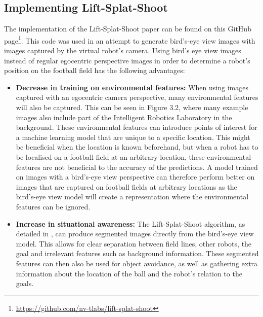 \documentclass{uva-inf-bachelor-thesis}
\begin{document}
        \subsection{Implementing Lift-Splat-Shoot}
            The implementation of the Lift-Splat-Shoot paper \cite{liftsplatshoot} can be found on this GitHub page\footnote{\url{https://github.com/nv-tlabs/lift-splat-shoot}}. This code was used in an attempt to generate bird's-eye view images with images captured by the virtual robot's camera. Using bird's eye view images instead of regular egocentric perspective images in order to determine a robot's position on the football field has the following advantages:
            \begin{itemize}
                \item \textbf{Decrease in training on environmental features:} When using images captured with an egocentric camera perspective, many environmental features will also be captured. This can be seen in Figure 3.2, where many example images also include part of the Intelligent Robotics Laboratory in the background. These environmental features can introduce points of interest for a machine learning model that are unique to a specific location. This might be beneficial when the location is known beforehand, but when a robot has to be localised on a football field at an arbitrary location, these environmental features are not beneficial to the accuracy of the predictions. A model trained on images with a bird's-eye view perspective can therefore perform better on images that are captured on football fields at arbitrary locations as the bird's-eye view model will create a representation where the environmental features can be ignored.
                \item \textbf{Increase in situational awareness:} The Lift-Splat-Shoot algorithm, as detailed in \cite{liftsplatshoot}, can produce segmented images directly from the bird's-eye view model. This allows for clear separation between field lines, other robots, the goal and irrelevant features such as background information. These segmented features can then also be used for object avoidance, as well as gathering extra information about the location of the ball and the robot's relation to the goals.
            \end{itemize}
\end{document}
